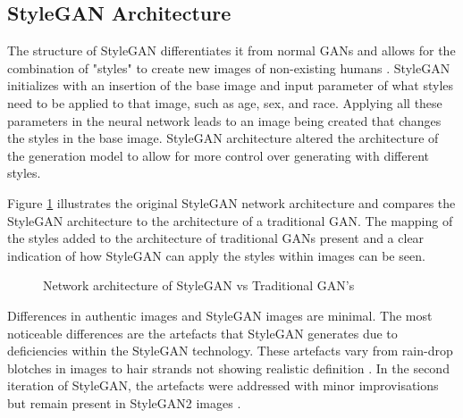 \subsection{StyleGAN Architecture}

The structure of StyleGAN differentiates it from normal GANs and allows for the combination of "styles" to create new images of non-existing humans \citep{Karras2019}. StyleGAN initializes with an insertion of the base image and input parameter of what styles need to be applied to that image, such as age, sex, and race. Applying all these parameters in the neural network leads to an image being created that changes the styles in the base image. StyleGAN architecture altered the architecture of the generation model to allow for more control over generating with different styles.

Figure \ref{fig:7} illustrates the original StyleGAN network architecture and compares the StyleGAN architecture to the architecture of a traditional GAN. The mapping of the styles added to the architecture of traditional GANs present and a clear indication of how StyleGAN can apply the styles within images can be seen.

\begin{figure}[H]%
\centering
{}%
\caption{Network architecture of StyleGAN vs Traditional GAN's \citep{Karras2019}}%
\label{fig:7}%
\end{figure}

Differences in authentic images and StyleGAN images are minimal. The most noticeable differences are the artefacts that StyleGAN generates due to deficiencies within the StyleGAN technology. These artefacts vary from rain-drop blotches in images to hair strands not showing realistic definition \citep{Karras2020}. In the second iteration of StyleGAN, the artefacts were addressed with minor improvisations but remain present in StyleGAN2 images \citep{Karras2020}.

